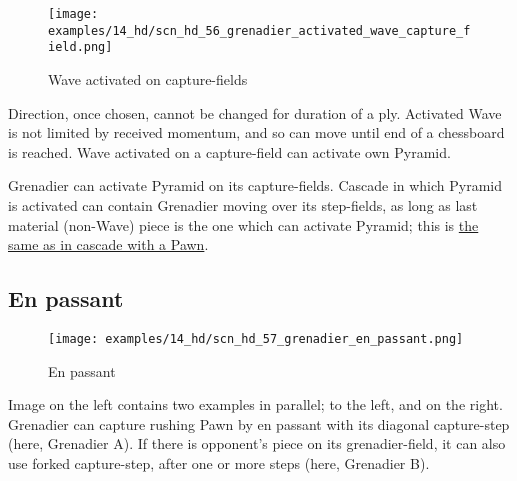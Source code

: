 \vspace*{0.1\baselineskip}
\noindent
\begin{figure}[!h]
\texttt{[image: examples/14\_hd/scn\_hd\_56\_grenadier\_activated\_wave\_capture\_field.png]}
\vspace*{-1.4\baselineskip}
\caption{Wave activated on capture-fields}
\label{fig:scn_hd_56_grenadier_activated_wave_capture_field}
\end{figure}

\vspace*{-0.5\baselineskip}
Direction, once chosen, cannot be changed for duration of a ply. Activated Wave
is not limited by received momentum, and so can move until end of a chessboard
is reached. Wave activated on a capture-field can activate own Pyramid.

Grenadier can activate Pyramid on its capture-fields. Cascade in which Pyramid
is activated can contain Grenadier moving over its step-fields, as long as last
material (non-Wave) piece is the one which can activate Pyramid; this is
\hyperref[fig:scn_n_18_sideways_pawns_cascade_pyramids]{the same as in cascade with a Pawn}.

\clearpage %

\subsection*{En passant}
\label{sec:Hemera's Dawn/Grenadier/En passant}

\vspace*{-1.1\baselineskip}
\noindent
\begin{wrapfigure}[10]{l}{0.4\textwidth}
\centering
\texttt{[image: examples/14\_hd/scn\_hd\_57\_grenadier\_en\_passant.png]}
\vspace*{-1.4\baselineskip}
\caption{En passant}
\label{fig:scn_hd_57_grenadier_en_passant}
\end{wrapfigure}
Image on the left contains two examples in parallel; to the left, and on the right. \newline
\indent
Grenadier can capture rushing Pawn by en passant with its diagonal capture-step (here,
Grenadier A). If there is opponent's piece on its grenadier-field, it can also use
forked capture-step, after one or more steps (here, Grenadier B).


